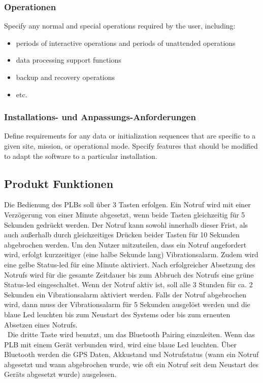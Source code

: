 \subsubsection{Operationen}
Specify any normal and special operations required by the user, including:
\begin{itemize}
	\item periods of interactive operations and periods of unattended operations
	\item data processing support functions
	\item backup and recovery operations
	\item etc.
\end{itemize}

\subsubsection{Installations- und Anpassungs-Anforderungen}
Define requirements for any data or initialization sequences that are specific to a given site, mission, or operational mode. Specify features that should be modified to adapt the software to a particular installation.

\subsection{Produkt Funktionen}
Die Bedienung des PLBs soll über 3 Tasten erfolgen. Ein Notruf wird mit einer Verzögerung von einer Minute abgesetzt, wenn beide Tasten gleichzeitig für 5 Sekunden gedrückt werden. Der Notruf kann sowohl innerhalb dieser Frist, als auch außerhalb durch gleichzeitiges Drücken beider Tasten für 10 Sekunden abgebrochen werden. 
Um den Nutzer mitzuteilen, dass ein Notruf angefordert wird, erfolgt kurzzeitiger (eine  halbe Sekunde lang) Vibrationsalarm. Zudem wird eine gelbe Status-led für eine Minute aktiviert. Nach erfolgreicher Absetzung des Notrufs wird für die gesamte Zeitdauer bis zum Abbruch des Notrufs eine grüne Status-led eingeschaltet. Wenn der Notruf aktiv ist, soll alle 3 Stunden für ca. 2 Sekunden ein Vibrationsalarm aktiviert werden. Falls der Notruf abgebrochen wird, dann muss der Vibrationsalarm für 5 Sekunden ausgelöst werden und die blaue Led leuchten bis zum Neustart des Systems oder bis zum erneuten Absetzen eines Notrufs.\\\
Die dritte Taste wird benutzt, um das Bluetooth Pairing einzuleiten. Wenn das PLB mit einem Gerät verbunden wird, wird eine blaue Led leuchten. Über Bluetooth werden die GPS Daten, Akkustand und Notrufstatus (wann ein Notruf abgesetzt und wann abgebrochen wurde, wie oft ein Notruf seit dem Neustart des Geräts abgesetzt wurde) ausgelesen.

